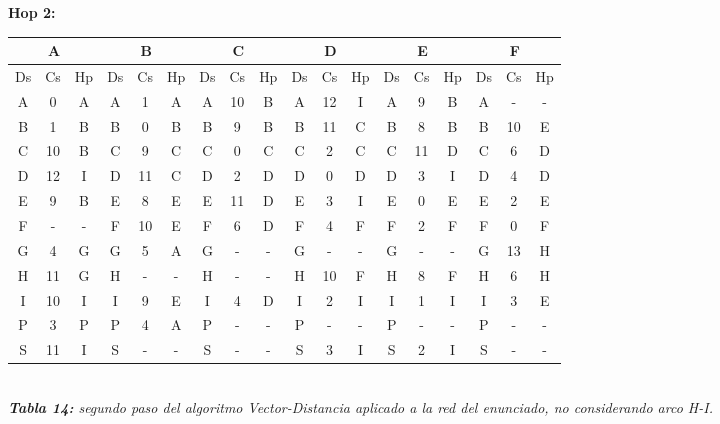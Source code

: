 \documentclass[letterpaper,10pt,onecolumn,titlepage]{article}
\begin{document}
\textbf{Hop 2:}
 \begin{center}
   \begin{tabular}{|c|c|c|c|c|c|c|c|c|c|c|c|c|c|c|c|c|c|} \hline
     \multicolumn{3}{|c|}{A} & \multicolumn{3}{|c|}{B} & \multicolumn{3}{|c|}{C} & \multicolumn{3}{|c|}{D} & \multicolumn{3}{|c|}{E} & \multicolumn{3}{|c|}{F} \\ \hline
     Ds & Cs & Hp & Ds & Cs & Hp & Ds & Cs & Hp & Ds & Cs & Hp & Ds & Cs & Hp & Ds & Cs & Hp \\ \hline
     A  & 0  & A  & A  & 1  & A  & A  & 10  & B  & A  & \color{red}12  & \color{red}I  & A  & \color{red}9  & \color{red}B  & A  & -  & - \\ \hline
     B  & 1  & B  & B  & 0  & B  & B  & 9  & B  & B  & \color{red}11  &\color{red} C  & B  & 8  & B & B  & \color{red}10  &\color{red} E \\ \hline
     C  & \color{red}10  & \color{red}B  & C  & 9  & C  & C  & 0  & C  & C  & 2  & C  & C  & \color{red}11  & \color{red}D  & C  &\color{red} 6  &\color{red} D \\ \hline
     D  & \color{red}12  &\color{red} I  & D  & \color{red}11  & \color{red}C & D  & \color{red}2  &\color{red} D  & D  & 0  & D  & D  & \color{red}3  & \color{red}I  & D  & 4  & D \\ \hline
     E  &\color{red} 9  & \color{red}B  & E  & 8  & E  & E  & \color{red}11  &\color{red} D  & E  & \color{red}3  &\color{red} I  & E  & 0  & E  & E  & 2  & E \\ \hline
     F  & -  & -  & F  & \color{red}10  & \color{red}E  & F  & \color{red}6  &\color{red} D  & F  & 4  & F  & F  & 2  & F  & F  & 0  & F \\ \hline
     G  & 4  & G  & G  & \color{red}5  & \color{red}A  & G  & -  & -  & G  & -  & -  & G  & -  & -  & G  & \color{red}13  & \color{red}H \\ \hline
     H  & \color{red}11  & \color{red}G  & H  & -  & -  & H  & -  & -  & H  & \color{red}10  &\color{red} F  & H  & \color{red}8  & \color{red}F  & H  & 6  & H \\ \hline
     I  & 10  & I  & I  & \color{red}9  & \color{red}E  & I  & \color{red}4  & \color{red}D  & I  & 2  & I  & I  & 1  & I  & I  & \color{red}3  & \color{red}E \\ \hline
     P  & 3  & P  & P  & \color{red}4  & \color{red}A  & P  & -  & -  & P  & -  & -  & P  & -  & -  & P  & -  & - \\ \hline
     S  &\color{red} 11  &\color{red} I  & S  & -  & -  & S  & -  & -  & S  & \color{red}3  & \color{red}I  & S  &\color{red} 2  & \color{red}I  & S  & -  & - \\ \hline
   \end{tabular}\\
   \textit{\textbf{Tabla 14:} segundo paso del algoritmo Vector-Distancia aplicado a la red del enunciado, no considerando arco H-I.}
 \end{center}
 
\end{document}
